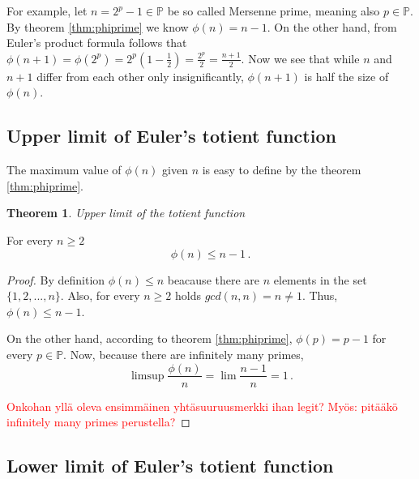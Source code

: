 \documentclass{article}
\theoremstyle{definition}
\newtheorem{theorem}[subsubsection]{Theorem}
\begin{document}
For example, let $n = 2^p - 1 \in \mathbb{P}$ be so called Mersenne prime, meaning also $p \in \mathbb{P}$. By theorem \ref{thm:phiprime} we know $\phi(n) = n - 1$. On the other hand, from Euler's product formula follows that $\phi(n+1) = \phi(2^p) = 2^p(1-\frac{1}{2}) = \frac{2^p}{2} = \frac{n+1}{2}$. Now we see that while $n$ and $n+1$ differ from each other only insignificantly, $\phi(n+1)$ is half the size of $\phi(n)$.

\subsection{Upper limit of Euler's totient function}

The maximum value of $\phi(n)$ given $n$ is easy to define by the theorem \ref{thm:phiprime}.

\begin{theorem}{\emph{Upper limit of the totient function}}

For every $n \geq 2$
\begin{equation*}
    \phi(n) \leq n-1\,.
\end{equation*}

\begin{proof}

By definition $\phi(n) \leq n$ beacause there are $n$ elements in the set $\{1,2,...,n\}$. Also, for every $n \geq 2$ holds $gcd(n,n) = n \neq 1$. Thus, $\phi(n) \leq n-1$.

On the other hand, according to theorem \ref{thm:phiprime}, $\phi(p) = p-1$ for every $p\in\mathbb{P}$.
Now, because there are infinitely many primes,
\begin{equation*}
    \limsup{\frac{\phi(n)}{n}} = \lim \frac{n-1}{n} = 1\,.
\end{equation*}

\textcolor{red}{Onkohan yllä oleva ensimmäinen yhtäsuuruusmerkki ihan legit? Myös: pitääkö infinitely many primes perustella?}

\end{proof}

\end{theorem}

\subsection{Lower limit of Euler's totient function}
\end{document}
